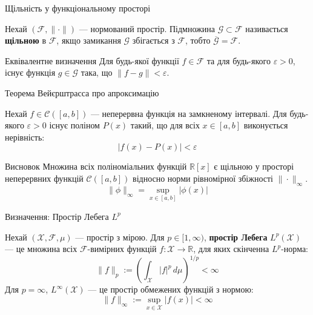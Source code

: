 \documentclass{zkdl-presentation-template}
\begin{document}
    \begin{frame}{Щільність у функціональному просторі}
        \begin{definition}
            Нехай $(\mathcal{F}, \|\cdot\|)$ --- нормований простір. Підмножина
            $\mathcal{G} \subset \mathcal{F}$ називається \textbf{щільною} в
            $\mathcal{F}$, якщо замикання $\mathcal{G}$ збігається з
            $\mathcal{F}$, тобто $\overline{\mathcal{G}} = \mathcal{F}$.
        \end{definition}

        \begin{block}{Еквівалентне визначення}
             Для будь-якої функції $f \in \mathcal{F}$ та для будь-якого
             $\varepsilon > 0$, існує функція $g \in \mathcal{G}$ така, що $\|f
             - g\| < \varepsilon$.
        \end{block}
    \end{frame}

    \begin{frame}{Теорема Вейєрштрасса про апроксимацію}
        \begin{theorem}[Weierstrass, 1885]
            Нехай $f \in \mathcal{C}([a,b])$ --- неперервна функція на замкненому інтервалі. Для будь-якого $\varepsilon > 0$ існує поліном $P(x)$ такий, що для всіх $x \in [a,b]$ виконується нерівність:
            $$ |f(x) - P(x)| < \varepsilon $$
        \end{theorem}
        
        \begin{block}{Висновок}
            Множина всіх поліноміальних функцій $\mathbb{R}[x]$ є щільною у просторі неперервних функцій $\mathcal{C}([a,b])$ відносно норми рівномірної збіжності $\|\cdot\|_{\infty}$.
            $$ \|\phi\|_{\infty} = \sup_{x \in [a,b]} |\phi(x)| $$
        \end{block}
    \end{frame}

    \begin{frame}{Визначення: Простір Лебега $L^p$}
        \begin{definition}
            Нехай $(\mathcal{X}, \mathcal{F}, \mu)$ --- простір з мірою. Для $p
            \in [1, \infty)$, \textbf{простір Лебега} $L^p(\mathcal{X})$ --- це
            множина всіх $\mathcal{F}$-вимірних функцій $f: \mathcal{X} \to
            \mathbb{R}$, для яких скінченна $L^p$-норма:
            $$ \|f\|_{p} := \left( \int_{\mathcal{X}} |f|^p \,d\mu \right)^{1/p}
            < \infty $$ Для $p=\infty$, $L^\infty(\mathcal{X})$ --- це простір
            обмежених функцій з нормою:
            $$ \|f\|_{\infty} := \underset{x \in \mathcal{X}}{\sup} |f(x)| < \infty$$
        \end{definition}
    \end{frame}
\end{document}
